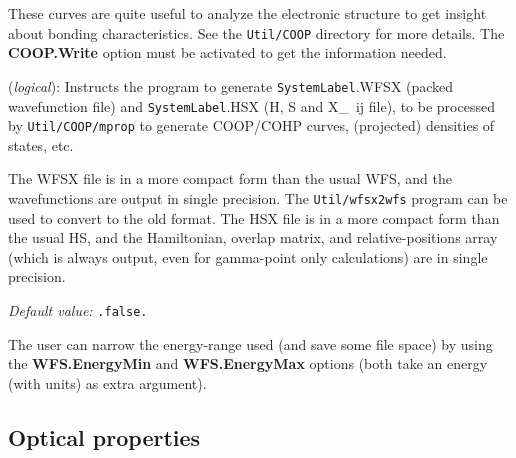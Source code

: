 \documentclass[11pt]{article}
\begin{document}
These curves are quite useful to analyze the electronic structure to
get insight about bonding characteristics. See the {\tt Util/COOP}
directory for more details. The {\bf COOP.Write} option must be
activated to get the information needed.

\begin{description}
\itemsep 10pt
\parsep 0pt

\item[{\bf COOP.Write}] ({\it logical}): 
Instructs the program to generate  {\tt SystemLabel}.WFSX (packed
wavefunction file) and  {\tt SystemLabel}.HSX (H, S and X\_~{ij} file),
to be processed by {\tt Util/COOP/mprop} to generate COOP/COHP curves,
(projected) densities of states, etc.

The WFSX file is in a more compact form than the usual WFS, and the
wavefunctions are output in single precision. The {\tt Util/wfsx2wfs}
program can be used to convert to the old format.
The HSX file is in a more compact form than the usual HS, and the
Hamiltonian, overlap matrix, and relative-positions array (which is
always output, even for gamma-point only calculations) are in
single precision.

{\it Default value:} {\tt .false.}

The user can narrow the energy-range used (and save some file space)
by using the {\bf WFS.EnergyMin} and {\bf WFS.EnergyMax} options (both take an
energy (with units) as extra argument).
        
\end{description}


\vspace{5pt}
\subsection{Optical properties}
\end{document}
